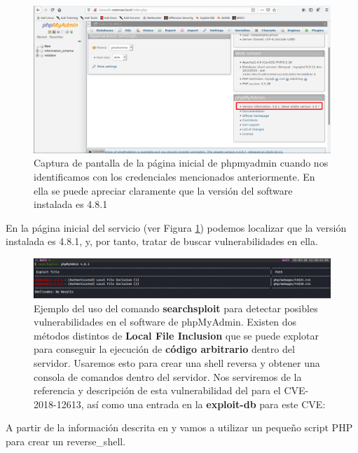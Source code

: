 \begin{figure}[!hbt]
  \centering
  \includegraphics[width=\textwidth]{imagenes/phpmyadmin_version.png}
  \caption{Captura de pantalla de la página inicial de phpmyadmin cuando nos identificamos con los credenciales mencionados anteriormente. En ella se puede apreciar claramente que la versión del software instalada es  4.8.1}
   \label{phmyadminverison}
\end{figure}

En la página inicial del servicio (ver Figura \ref{phmyadminverison}) podemos localizar que la versión instalada es 4.8.1, y, por tanto, tratar de buscar vulnerabilidades en ella.


\begin{figure}[!hbt]
  \centering
  \includegraphics[width=\textwidth]{imagenes/searchexploit1.png}
  \caption{Ejemplo del uso del comando \textbf{searchsploit} para detectar posibles vulnerabilidades en el software de phpMyAdmin. Existen dos métodos distintos de \textbf{Local File Inclusion} que se puede explotar para conseguir la ejecución de \textbf{código arbitrario} dentro del servidor. Usaremos esto para crear una shell reversa y obtener una consola de comandos dentro del servidor. Nos serviremos de la referencia y descripción de esta vulnerabilidad del \cite{cve12613} para el CVE-2018-12613, así como una entrada en la \textbf{exploit-db} para este CVE: \cite{exploitdb2}}
   \label{searchexploit}
\end{figure}

A partir de la información descrita en \cite{cve12613} y \cite{exploitdb2} vamos a utilizar un pequeño script PHP para crear un \gls{reverse_shell}. 

